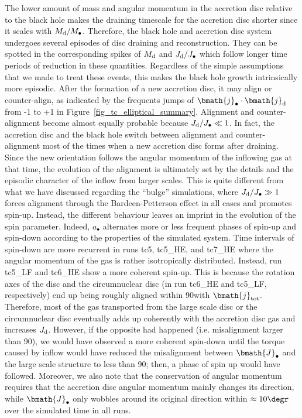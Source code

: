 \documentclass[a4paper,fleqn,usenatbib]{mnras}
\begin{document}
The lower amount of mass and angular momentum in the accretion disc relative to the black hole makes the draining timescale for the accretion disc shorter since it scales with $M_{\rm d}/M_{\bullet}$.
Therefore, the black hole and accretion disc system undergoes several episodes of disc draining and reconstruction.
They can be spotted in the corresponding spikes of $M_{\rm d}$ and $J_{\rm d}/ J_{\bullet}$ which follow longer time periods of reduction in these quantities.
Regardless of the simple assumptions that we made to treat these events, this makes the black hole growth intrinsically more episodic.
After the formation of a new accretion disc, it may align or counter-align, as indicated by the frequents jumps of $\bmath{j}_{\bullet} \cdot \bmath{j}_{\rm d}$ from -1 to +1 in Figure~\ref{fig_tc_elliptical_summary}.
Alignment and counter-alignment become almost equally probable because $J_{\rm d} / J_{\bullet} \ll 1$.
In fact, the accretion disc and the black hole switch between alignment and counter-alignment most of the times when a new accretion disc forms after draining. Since the new orientation follows the angular momentum of the inflowing gas at that time, the evolution of the alignment is ultimately set by the details and the episodic character of the inflow from larger scales.
This is quite different from what we have discussed regarding the ``bulge'' simulations, where $J_{\rm d} / J_{\bullet} \gg 1$ forces alignment through the Bardeen-Petterson effect in all cases and promotes spin-up.
Instead, the different behaviour leaves an imprint in the evolution of the spin parameter.
Indeed, $a_{\bullet}$ alternates more or less frequent phases of spin-up and spin-down according to the properties of the simulated system.
Time intervals of spin-down are more recurrent in runs tc5, tc5\_HE, and tc7\_HE where the angular momentum of the gas is rather isotropically distributed.
Instead, run tc5\_LF and tc6\_HE show a more coherent spin-up.
This is because the rotation axes of the disc and the circumnuclear disc (in run tc6\_HE and tc5\_LF, respectively) end up being roughly aligned within 90\degr with $\bmath{j}_{\rm tot}$.
Therefore, most of the gas transported from the large scale disc or the circumnuclear disc eventually adds up coherently with the accretion disc gas and increases $J_{\rm d}$.
However, if the opposite had happened (i.e. misalignment larger than 90\degr), we would have observed a more coherent spin-down until the torque caused by inflow would have reduced the misalignment between $\bmath{J}_{\bullet}$ and the large scale structure to less than 90\degr; then, a phase of spin up would have followed.
Moreover, we also note that the conservation of angular momentum requires that the accretion disc angular momentum mainly changes its direction, while $\bmath{J}_{\bullet}$ only wobbles around its original direction within $\approx 10\degr$ over the simulated time in all runs.
\end{document}
